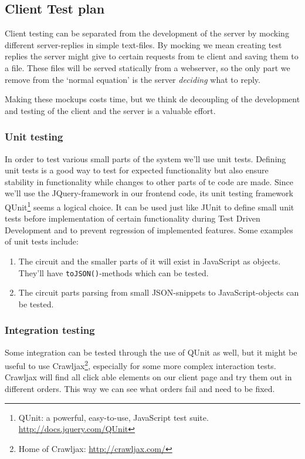 \subsection{Client Test plan}
Client testing can be separated from the development of the server by mocking different server-replies in simple text-files. By mocking we mean creating test replies the server might give to certain requests from te client and saving them to a file. These files will be served statically from a webserver, so the only part we remove from the `normal equation' is the server \textit{deciding} what to reply.

Making these mockups costs time, but we think de decoupling of the development and testing of the client and the server is a valuable effort.

\subsubsection{Unit testing}
In order to test various small parts of the system we'll use unit tests. Defining unit tests is a good way to test for expected functionality but also ensure stability in functionality while changes to other parts of te code are made. Since we'll use the JQuery-framework in our frontend code, its unit testing framework QUnit\footnote{QUnit: a powerful, easy-to-use, JavaScript test suite. \url{http://docs.jquery.com/QUnit}} seems a logical choice. It can be used just like JUnit to define small unit tests before implementation of certain functionality during Test Driven Development and to prevent regression of implemented features. Some examples of unit tests include:
\begin{enumerate}
	\item The circuit and the smaller parts of it will exist in JavaScript as objects. They'll have \verb|toJSON()|-methods which can be tested.
	\item The circuit parts parsing from small JSON-snippets to JavaScript-objects can be tested.
\end{enumerate}

\subsubsection{Integration testing}
Some integration can be tested through the use of QUnit as well, but it might be useful to use Crawljax\footnote{Home of Crawljax: \url{http://crawljax.com/}}, especially for some more complex interaction tests. Crawljax will find all click able elements on our client page and try them out in different orders. This way we can see what orders fail and need to be fixed.

